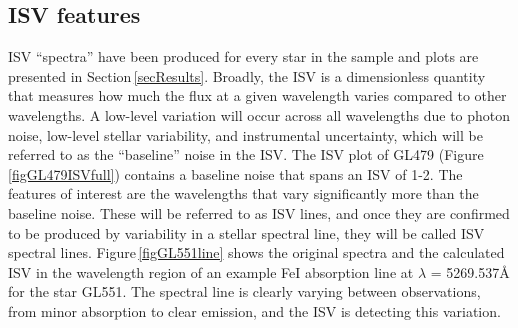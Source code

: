 \subsection{ISV features}
\label{secISVfeatures}
ISV ``spectra'' have been produced for every star in the sample and plots are presented in Section\,\ref{secResults}. Broadly, the ISV is a dimensionless quantity that measures how much the flux at a given wavelength varies compared to other wavelengths. A low-level variation will occur across all wavelengths due to photon noise, low-level stellar variability, and instrumental uncertainty, which will be referred to as the ``baseline'' noise in the ISV. The ISV plot of GL479 (Figure\,\ref{figGL479ISVfull}) contains a baseline noise that spans an ISV of 1-2. The features of interest are the wavelengths that vary significantly more than the baseline noise. These will be referred to as ISV lines, and once they are confirmed to be produced by variability in a stellar spectral line, they will be called ISV spectral lines. Figure\,\ref{figGL551line} shows the original spectra and the calculated ISV in the wavelength region of an example Fe\textsc{I} absorption line at $\lambda$ = 5269.537\hbox{\AA}  for the star GL551. The spectral line is clearly varying between observations, from minor absorption to clear emission, and the ISV is detecting this variation. \\

